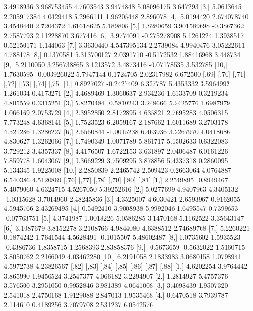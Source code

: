 \documentclass[12pt]{article}
\begin{document}
\begin{Schunk}
\begin{Soutput}
 [2,] 3.4918936  3.968753455  4.7603543  3.9474848  5.08096175 3.647293
 [3,] 5.0613645  2.205917384  4.0429418  5.2966111  1.96205448 2.896078
 [4,] 5.0194420  2.674078740  3.4548440  2.7204372  1.61618625 5.189808
 [5,] 1.8280659  3.901589698 -0.3867362  2.7587793  2.11228870 3.677416
 [6,] 3.9774091 -0.275278908  5.1261224  1.3938517  0.52150171 1.144063
 [7,] 3.3630440  4.547395134  2.2739084  4.9940476  3.05222611 4.788178
 [8,] 0.1370581  6.313700127  2.0391710 -0.5172532  1.88416968 3.448734
 [9,] 5.2110050  3.256738865  3.1213572  3.4873416 -0.07178535 3.532785
[10,] 1.7630595 -0.003926022  5.7947144  0.1724705  2.02317982 6.672500
          [,69]      [,70]    [,71]     [,72]     [,73]    [,74]     [,75]
 [1,] 0.8927027 -0.2427409 6.327787 5.4353332 3.5964992 1.261034 0.4173271
 [2,] 4.4689469  1.3060637 2.934236 1.6133709 0.3219234 4.805559 0.3315251
 [3,] 5.8270484 -0.5810243 3.248666 5.2425776 1.6987979 1.066169 2.0753729
 [4,] 2.3952850  2.8172895 4.635821 2.7695283 4.0506315 7.773248 4.6368141
 [5,] 1.7523523  6.2059167 2.187662 1.6011689 3.2703178 4.521286 1.3286227
 [6,] 2.6560844 -1.0015238 6.463936 3.2267970 4.0418686 4.830627 1.3262066
 [7,] 1.7490349  1.0071789 5.861717 5.1502633 0.6322083 3.729212 3.4357337
 [8,] 4.4176507  1.6722153 3.631897 2.0406487 6.0161226 7.859778 1.6043067
 [9,] 0.3669229  3.7509295 3.878856 5.4337318 0.2860095 5.134345 1.9225008
[10,] 2.2850839  2.2465742 2.509423 0.2663064 4.0764887 6.540386 4.5120869
           [,76]      [,77]      [,78]      [,79]      [,80]       [,81]
 [1,]  2.2549895 -0.8949467  5.4079060  4.6324715  4.5267050  5.39252616
 [2,]  5.0277699  4.9407963  4.3405132 -1.0315628  3.7014960  2.48245836
 [3,]  4.3525007  4.6030421  2.6593967  0.9162055  4.5945766  2.43269495
 [4,]  0.5492410  3.9008938  5.9992046  1.6495547  0.7399653 -0.07763751
 [5,]  4.3741987  1.0018226  5.0586285  3.1470168  5.1162522  3.35643147
 [6,]  3.1087679  3.8152278  3.2108766  4.9844080  4.6388512  2.74689768
 [7,]  5.2260221  0.1874242  1.7641544  4.5628491 -0.1015507  5.48602487
 [8,]  1.0735602  1.5935523 -0.4386736  1.8358715  1.2568393  2.83858376
 [9,] -0.5673659 -0.5632022  1.5160715  3.8050762  2.2166049  4.03462280
[10,]  6.2191058  2.1833983  3.0680158  1.0798941  4.5972738  4.23826567
          [,82]      [,83]     [,84]      [,85]     [,86]    [,87]     [,88]
 [1,] 4.6202254  3.9764442  3.865990  1.9456524 3.2547377 4.066182 3.2294907
 [2,] 1.2814927  5.4757376  3.576500  3.2951050 0.9952846 3.981389 4.0641008
 [3,] 3.4098439  1.9507320  2.541018  2.4750168 1.9129088 2.847013 1.9535468
 [4,] 0.6470518  3.7939787  2.114610  0.4189256 3.7079708 2.531237 6.0542576

\end{Soutput}
\end{Schunk}
\end{document}
